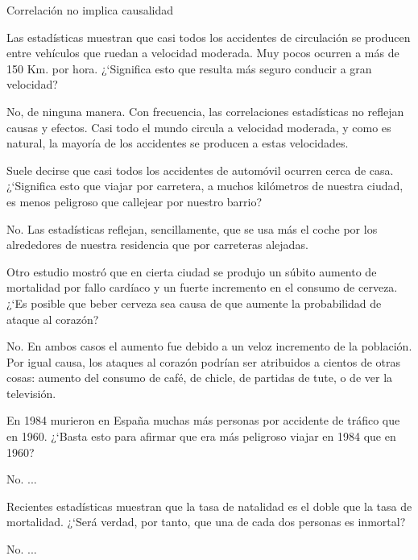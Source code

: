 \begin{myexampleblock}{Correlación no implica causalidad}
\begin{small}
\vspace{2mm} Las estadísticas muestran que casi todos los accidentes de circulación se producen entre vehículos que ruedan a velocidad moderada. Muy pocos ocurren a más de 150 Km. por hora. ¿`Significa esto que resulta más seguro conducir a gran velocidad? 

\vspace{2mm} \textcolor{gris}{No, de ninguna manera. Con frecuencia, las correlaciones estadísticas no reflejan causas y efectos. Casi todo el mundo circula a velocidad moderada, y como es natural, la mayoría de los accidentes se producen a estas velocidades.} 

\vspace{2mm} Suele decirse que casi todos los accidentes de automóvil ocurren cerca de casa. ¿`Significa esto que viajar por carretera, a muchos kilómetros de nuestra ciudad, es menos peligroso que callejear por nuestro barrio? 

\vspace{2mm} \textcolor{gris}{No. Las estadísticas reflejan, sencillamente, que se usa más el coche por los alrededores de nuestra residencia que por carreteras alejadas.} 

\vspace{2mm} Otro estudio mostró que en cierta ciudad se produjo un súbito aumento de mortalidad por fallo cardíaco y un fuerte incremento en el consumo de cerveza. ¿`Es posible que beber cerveza sea causa de que aumente la probabilidad de ataque al corazón? 

\vspace{2mm} \textcolor{gris}{No. En ambos casos el aumento fue debido a un veloz incremento de la población. Por igual causa, los ataques al corazón podrían ser atribuidos a cientos de otras cosas: aumento del consumo de café, de chicle, de partidas de tute, o de ver la televisión.}
 
\vspace{2mm} En 1984 murieron en España muchas más personas por accidente de tráfico que en 1960. ¿`Basta esto para afirmar que era más peligroso viajar en 1984 que en 1960? 

\vspace{2mm} \textcolor{gris}{No. ... }

\vspace{2mm} Recientes estadísticas muestran que la tasa de natalidad es el doble que la tasa de mortalidad. ¿`Será verdad, por tanto, que una de cada dos personas es inmortal? 

\vspace{2mm} \textcolor{gris}{No. ... }


\end{small}
\end{myexampleblock}

